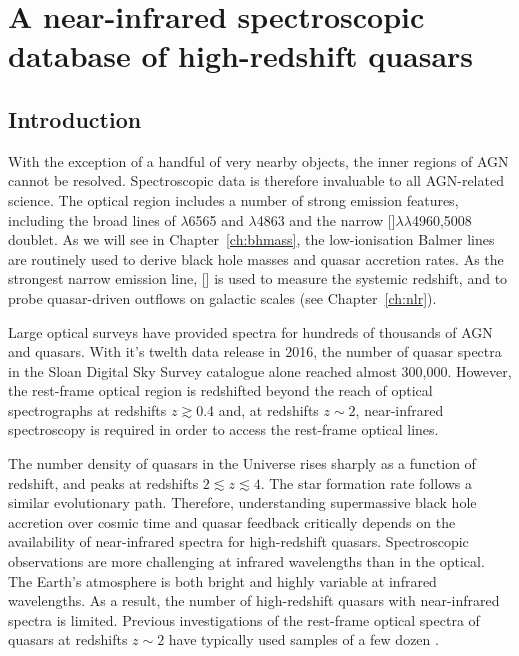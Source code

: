 
\chapter{A near-infrared spectroscopic database of high-redshift quasars}
\label{ch:nirsample}

\section{Introduction}

With the exception of a handful of very nearby objects, the inner regions of AGN cannot be resolved. 
Spectroscopic data is therefore invaluable to all AGN-related science. 
The optical region includes a number of strong emission features, including the broad lines of \hans$\lambda$6565 and \hbns$\lambda$4863 and the narrow []$\lambda\lambda$4960,5008 doublet. 
As we will see in Chapter~\ref{ch:bhmass}, the low-ionisation Balmer lines are routinely used to derive black hole masses and quasar accretion rates. 
As the strongest narrow emission line, [] is used to measure the systemic redshift, and to probe quasar-driven outflows on galactic scales (see Chapter~\ref{ch:nlr}). 

Large optical surveys have provided spectra for hundreds of thousands of AGN and quasars. 
With it's twelth data release in 2016, the number of quasar spectra in the Sloan Digital Sky Survey \citep[SDSS;][]{york00} catalogue alone reached almost 300,000. 
However, the rest-frame optical region is redshifted beyond the reach of optical spectrographs at redshifts $z \gtrsim$0.4 and, at redshifts $z\sim2$, near-infrared spectroscopy is required in order to access the rest-frame optical lines. 

The number density of quasars in the Universe rises sharply as a function of redshift, and peaks at redshifts $2\lesssim z \lesssim 4$. 
The star formation rate follows a similar evolutionary path. 
Therefore, understanding supermassive black hole accretion over cosmic time and quasar feedback critically depends on the availability of near-infrared spectra for high-redshift quasars. 
Spectroscopic observations are more challenging at infrared wavelengths than in the optical.
The Earth's atmosphere is both bright and highly variable at infrared wavelengths. 
As a result, the number of high-redshift quasars with near-infrared spectra is limited. 
Previous investigations of the rest-frame optical spectra of quasars at redshifts $z\sim2$ have typically used samples of a few dozen \citep[e.g.][]{shen12,shen16a}. 

